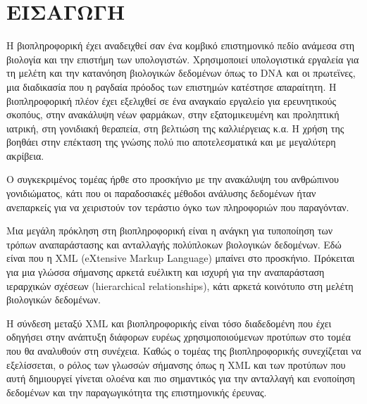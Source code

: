 \chapter{ΕΙΣΑΓΩΓΗ}

    Η βιοπληροφορική έχει αναδειχθεί σαν ένα κομβικό επιστημονικό πεδίο ανάμεσα στη βιολογία και την επιστήμη των υπολογιστών.
    Χρησιμοποιεί υπολογιστικά εργαλεία για τη μελέτη και την κατανόηση βιολογικών δεδομένων όπως το DNA και οι πρωτεϊνες, μια διαδικασία που η ραγδαία πρόοδος των επιστημών κατέστησε απαραίτητη.
    Η βιοπληροφορική πλέον έχει εξελιχθεί σε ένα αναγκαίο εργαλείο για ερευνητικούς σκοπόυς, στην ανακάλυψη νέων φαρμάκων, στην εξατομικευμένη και προληπτική ιατρική, στη γονιδιακή θεραπεία, στη βελτιώση της καλλιέργειας κ.α.
    Η χρήση της βοηθάει στην επέκταση της γνώσης πολύ πιο αποτελεσματικά και με μεγαλύτερη ακρίβεια.

    Ο συγκεκριμένος τομέας ήρθε στο προσκήνιο με την ανακάλυψη του ανθρώπινου γονιδιώματος, κάτι που οι παραδοσιακές μέθοδοι ανάλυσης δεδομένων ήταν ανεπαρκείς για να χειριστούν τον τεράστιο όγκο των πληροφοριών που παραγόνταν.

    Μια μεγάλη πρόκληση στη βιοπληροφορική είναι η ανάγκη για τυποποίηση των τρόπων αναπαράστασης και ανταλλαγής πολύπλοκων βιολογικών δεδομένων.
    Εδώ είναι που η XML (eXtensive Markup Language) μπαίνει στο προσκήνιο.
    Πρόκειται για μια γλώσσα σήμανσης αρκετά ευέλικτη και ισχυρή για την αναπαράσταση ιεραρχικών σχέσεων (hierarchical relationships), κάτι αρκετά κοινότυπο στη μελέτη βιολογικών δεδομένων.

    Η σύνδεση μεταξύ XML και βιοπληροφορικής είναι τόσο διαδεδομένη που έχει οδηγήσει στην ανάπτυξη διάφορων ευρέως χρησιμοποιούμενων προτύπων στο τομέα που θα αναλυθούν στη συνέχεια.
    Καθώς ο τομέας της βιοπληροφορικής συνεχίζεται να εξελίσσεται, ο ρόλος των γλωσσών σήμανσης όπως η XML και των προτύπων που αυτή δημιουργεί γίνεται ολοένα και πιο σημαντικός για την ανταλλαγή και ενοποίηση δεδομένων και την παραγωγικότητα της επιστημονικής έρευνας.



